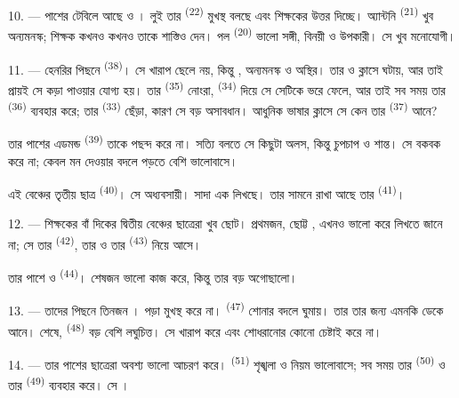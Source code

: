 10. --- পাশের টেবিলে আছে  ও । লুই তার
 \textsuperscript{(22)} মুখস্থ বলছে এবং শিক্ষকের 
উত্তর দিচ্ছে। অ্যান্টনি \textsuperscript{(21)} খুব অন্যমনস্ক; শিক্ষক কখনও কখনও
তাকে শাস্তিও দেন। পল \textsuperscript{(20)} ভালো সঙ্গী, বিনয়ী ও উপকারী। সে খুব
মনোযোগী।

\VUsaut{4.2mm}
\VUsaut{3.2mm}

11. --- হেনরির পিছনে  \textsuperscript{(38)}। সে খারাপ ছেলে নয়,
কিন্তু , অন্যমনস্ক ও অস্থির। তার  ও
 ক্লাসে  ঘটায়, আর তাই প্রায়ই সে কড়া
 পাওয়ার যোগ্য হয়। তার 
\textsuperscript{(35)} নোংরা,  \textsuperscript{(34)} দিয়ে সে সেটিকে
 ভরে ফেলে, আর তাই সব সময় তার 
\textsuperscript{(36)} ব্যবহার করে; তার  \textsuperscript{(33)} ছেঁড়া,
কারণ সে বড় অসাবধান। আধুনিক ভাষার ক্লাসে সে কেন তার 
\textsuperscript{(37)} আনে?

তার পাশের এডমন্ড \textsuperscript{(39)} তাকে পছন্দ করে না। সত্যি বলতে সে কিছুটা
অলস, কিন্তু চুপচাপ ও শান্ত। সে বকবক করে না; কেবল মন দেওয়ার বদলে
  পড়তে বেশি ভালোবাসে।

এই বেঞ্চের তৃতীয় ছাত্র  \textsuperscript{(40)}। সে
অধ্যবসায়ী। সাদা এক  লিখছে। তার সামনে রাখা আছে তার
 \textsuperscript{(41)}।

12. --- শিক্ষকের বাঁ দিকের দ্বিতীয় বেঞ্চের ছাত্রেরা খুব ছোট। প্রথমজন,
ছোট্ট , এখনও ভালো করে লিখতে জানে না; সে তার 
\textsuperscript{(42)}, তার  ও তার 
\textsuperscript{(43)} নিয়ে আসে।

তার পাশে  ও  \textsuperscript{(44)}। শেষজন ভালো
কাজ করে, কিন্তু তার  বড় অগোছালো।

13. --- তাদের পিছনে তিনজন ।  পড়া মুখস্থ করে
না।  \textsuperscript{(47)} শোনার বদলে ঘুমায়। তার 
তার জন্য  এমনকি  ডেকে আনে। শেষে,
 \textsuperscript{(48)} বড় বেশি লঘুচিত্ত। সে খারাপ
 করে এবং শোধরানোর কোনো চেষ্টাই করে না।

14. --- তার পাশের ছাত্রেরা অবশ্য ভালো আচরণ করে। 
\textsuperscript{(51)} শৃঙ্খলা ও নিয়ম ভালোবাসে; সব সময় তার 
\textsuperscript{(50)} ও তার  \textsuperscript{(49)} ব্যবহার করে। সে
।

